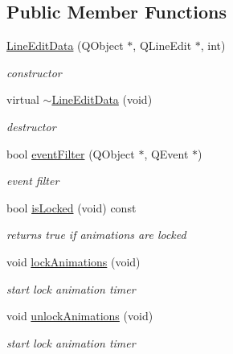 \subsection*{Public Member Functions}
\begin{DoxyCompactItemize}
\item 
\mbox{\label{class_line_edit_data_ade69571384553bd424736eb8b05e5aa4}} 
\hyperlink{class_line_edit_data_ade69571384553bd424736eb8b05e5aa4}{Line\+Edit\+Data} (Q\+Object $\ast$, Q\+Line\+Edit $\ast$, int)
\begin{DoxyCompactList}\small\item\em constructor \end{DoxyCompactList}\item 
\mbox{\label{class_line_edit_data_afe62bdde267f1675691d8b5a09e7fc03}} 
virtual \hyperlink{class_line_edit_data_afe62bdde267f1675691d8b5a09e7fc03}{$\sim$\+Line\+Edit\+Data} (void)
\begin{DoxyCompactList}\small\item\em destructor \end{DoxyCompactList}\item 
\mbox{\label{class_line_edit_data_a6165bce3de6638cb009a18315ac9fe4e}} 
bool \hyperlink{class_line_edit_data_a6165bce3de6638cb009a18315ac9fe4e}{event\+Filter} (Q\+Object $\ast$, Q\+Event $\ast$)
\begin{DoxyCompactList}\small\item\em event filter \end{DoxyCompactList}\item 
\mbox{\label{class_line_edit_data_ac864182b768e6469b285abd2c7b2b7b6}} 
bool \hyperlink{class_line_edit_data_ac864182b768e6469b285abd2c7b2b7b6}{is\+Locked} (void) const
\begin{DoxyCompactList}\small\item\em returns true if animations are locked \end{DoxyCompactList}\item 
\mbox{\label{class_line_edit_data_a2da892d7a55a3a6f111e7f3b70ea02b6}} 
void \hyperlink{class_line_edit_data_a2da892d7a55a3a6f111e7f3b70ea02b6}{lock\+Animations} (void)
\begin{DoxyCompactList}\small\item\em start lock animation timer \end{DoxyCompactList}\item 
\mbox{\label{class_line_edit_data_a06822afa9e9c25b8dcb648e7bd2c9850}} 
void \hyperlink{class_line_edit_data_a06822afa9e9c25b8dcb648e7bd2c9850}{unlock\+Animations} (void)
\begin{DoxyCompactList}\small\item\em start lock animation timer \end{DoxyCompactList}\end{DoxyCompactItemize}
